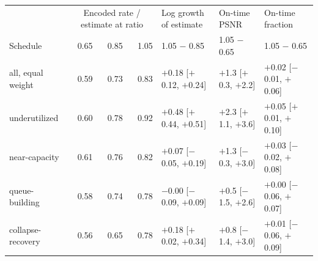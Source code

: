 \begin{tabular}{lrrrlll}
\toprule
 & \multicolumn{3}{c}{Encoded rate / estimate at ratio} & Log growth of estimate & On-time PSNR & On-time fraction \\
Schedule & 0.65 & 0.85 & 1.05 & 1.05 $-$ 0.85 & 1.05 $-$ 0.65 & 1.05 $-$ 0.65 \\
\midrule
all, equal weight & 0.59 & 0.73 & 0.83 & $+$0.18 [$+$0.12, $+$0.24] & $+$1.3 [$+$0.3, $+$2.2] & $+$0.02 [$-$0.01, $+$0.06] \\
underutilized & 0.60 & 0.78 & 0.92 & $+$0.48 [$+$0.44, $+$0.51] & $+$2.3 [$+$1.1, $+$3.6] & $+$0.05 [$+$0.01, $+$0.10] \\
near-capacity & 0.61 & 0.76 & 0.82 & $+$0.07 [$-$0.05, $+$0.19] & $+$1.3 [$-$0.3, $+$3.0] & $+$0.03 [$-$0.02, $+$0.08] \\
queue-building & 0.58 & 0.74 & 0.78 & $-$0.00 [$-$0.09, $+$0.09] & $+$0.5 [$-$1.5, $+$2.6] & $+$0.00 [$-$0.06, $+$0.07] \\
collapse-recovery & 0.56 & 0.65 & 0.78 & $+$0.18 [$+$0.02, $+$0.34] & $+$0.8 [$-$1.4, $+$3.0] & $+$0.01 [$-$0.06, $+$0.09] \\
\bottomrule
\end{tabular}
